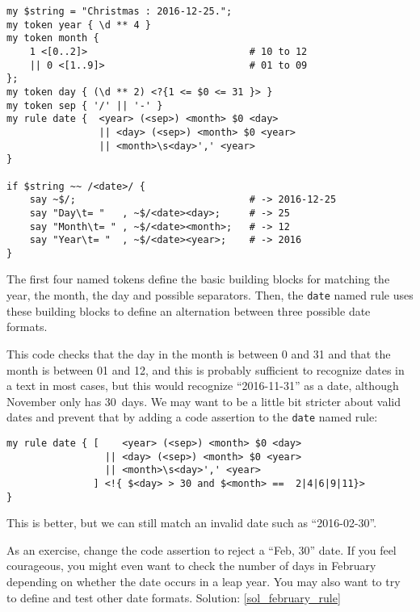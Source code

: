 \begin{verbatim}
my $string = "Christmas : 2016-12-25.";                                         
my token year { \d ** 4 }                                        
my token month {   
    1 <[0..2]>                            # 10 to 12                     
    || 0 <[1..9]>                         # 01 to 09                     
};
my token day { (\d ** 2) <?{1 <= $0 <= 31 }> }  
my token sep { '/' || '-' } 
my rule date {  <year> (<sep>) <month> $0 <day> 
                || <day> (<sep>) <month> $0 <year> 
                || <month>\s<day>',' <year>
}                         

if $string ~~ /<date>/ {
    say ~$/;                              # -> 2016-12-25
    say "Day\t= "   , ~$/<date><day>;     # -> 25
    say "Month\t= " , ~$/<date><month>;   # -> 12
    say "Year\t= "  , ~$/<date><year>;    # -> 2016
}          
\end{verbatim} 

The first four named tokens define the basic building 
blocks for matching the year, the month, the day and 
possible separators. Then, the {\tt date}  
named rule uses these building blocks to define an 
alternation between three possible date formats.

This code checks that the day in the month is between 0 and 31 
and that the month is between 01 and 12, and this is 
probably sufficient to recognize dates in a 
text in most cases, but this would recognize ``2016-11-31'' as a date, 
although November only has 30~days. We may want to be a 
little bit stricter about valid dates and prevent that
by adding a code assertion to the {\tt date} named rule:

\begin{verbatim}
my rule date { [    <year> (<sep>) <month> $0 <day> 
                 || <day> (<sep>) <month> $0 <year> 
                 || <month>\s<day>',' <year>
               ] <!{ $<day> > 30 and $<month> ==  2|4|6|9|11}>
}                         
\end{verbatim}


This is better, but we can still match an invalid date 
such as ``2016-02-30''. 

\begin{exercise}
\label{february_rule}
%
As an exercise, change the code 
assertion to reject a ``Feb, 30'' date. If you feel 
courageous, you might even want to check the number of 
days in February depending on whether the date occurs in 
a leap year. You may also want to try to define and test 
other date formats. Solution: \ref{sol_february_rule}
\end{exercise}


